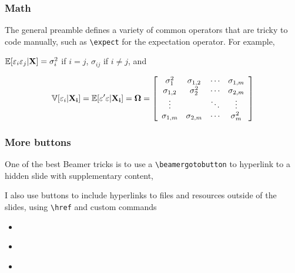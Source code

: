 \documentclass[aspectratio=169,handout]{beamer}
\begin{document}
\begin{frame}
	\frametitle{Math}
	\begin{witem}
	\item The general preamble defines a variety of common operators that are tricky to
		code manually, such as \texttt{\textbackslash{}expect} for the expectation operator. For example,

	\item
	 $\mathbb{E}[\varepsilon_i \varepsilon_j|\mathbf{X}] = \sigma_i^2$ if $i=j$, $\sigma_{ij}$ if $i \neq j$, and

		\begin{equation*}
		\mathbb{V}[\varepsilon_i|\mathbf{X_{i}}]
		=\mathbb{E}[\varepsilon^\prime \varepsilon | \mathbf{X_{i}}]
		= \boldsymbol{\Omega}
		= \left[
		\begin{array}{cccc}
			\sigma_1^2 		& \sigma_{1,2}	&	\cdots 	& \sigma_{1,m} 		\\
			\sigma_{1,2}		& \sigma_2^2 	&	\cdots 	& \sigma_{2,m} 		\\
			\vdots			&				&	\ddots	& \vdots				\\
			\sigma_{1,m}		& \sigma_{2,m}	&	\cdots 	& \sigma_m^2
		\end{array} \right]
		\end{equation*}
	\end{witem}
\end{frame}



\begin{frame}\label{fr:buttons}
	\frametitle{More buttons}
	\begin{witem}
		\item One of the best Beamer tricks is to use a 
			\texttt{\textbackslash{}beamergotobutton} to hyperlink to 
			a hidden slide with supplementary content, 
			\hyperlink{fr:hidden}{}
		\item I also use buttons to include hyperlinks to files and resources
			outside of the slides, using \texttt{\textbackslash{}href} and
			custom commands
			\begin{itemize}
				\item \href{https://drive.google.com/}{}
				\item \href{https://github.com/NicDuquette/Beamer-template/blob/main/README.md}{}
				\item \href{https://www.thebunnymuseum.com/}{}
			\end{itemize}

	\end{witem}
\end{frame}
	
\end{document}
